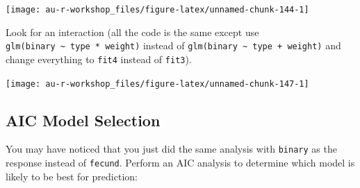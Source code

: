 \documentclass[]{book}
\newenvironment{Shaded}{\begin{snugshade}}{\end{snugshade}}
\newcommand{\DataTypeTok}[1]{\textcolor[rgb]{0.13,0.29,0.53}{#1}}
\newcommand{\DecValTok}[1]{\textcolor[rgb]{0.00,0.00,0.81}{#1}}
\newcommand{\KeywordTok}[1]{\textcolor[rgb]{0.13,0.29,0.53}{\textbf{#1}}}
\newcommand{\NormalTok}[1]{#1}
\newcommand{\OperatorTok}[1]{\textcolor[rgb]{0.81,0.36,0.00}{\textbf{#1}}}
\newcommand{\StringTok}[1]{\textcolor[rgb]{0.31,0.60,0.02}{#1}}
\begin{document}
\begin{center}\texttt{[image: au-r-workshop\_files/figure-latex/unnamed-chunk-144-1]} \end{center}

Look for an interaction (all the code is the same except use \texttt{glm(binary\ \textasciitilde{}\ type\ *\ weight)} instead of \texttt{glm(binary\ \textasciitilde{}\ type\ +\ weight)} and change everything to \texttt{fit4} instead of \texttt{fit3}).

\begin{Shaded}
\end{Shaded}

\begin{center}\texttt{[image: au-r-workshop\_files/figure-latex/unnamed-chunk-147-1]} \end{center}

\hypertarget{aic-model-selection-1}{%
\subsection{AIC Model Selection}\label{aic-model-selection-1}}

You may have noticed that you just did the same analysis with \texttt{binary} as the response instead of \texttt{fecund}. Perform an AIC analysis to determine which model is likely to be best for prediction:
\end{document}

